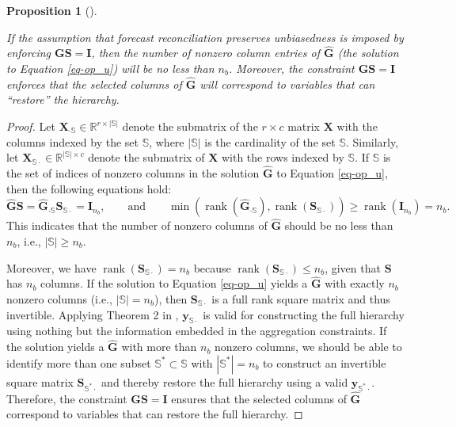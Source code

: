 \documentclass[
  11pt]{article}
\theoremstyle{plain}
\newtheorem{proposition}{Proposition}[section]
\theoremstyle{remark}
\begin{document}
\begin{proposition}[]\protect\hypertarget{prp-1}{}\label{prp-1}

If the assumption that forecast reconciliation preserves unbiasedness is
imposed by enforcing \(\bm{GS}=\bm{I}\), then the number of nonzero
column entries of \(\hat{\bm{G}}\) (the solution to Equation
\eqref{eq-op_u}) will be no less than \(n_b\). Moreover, the constraint
\(\bm{GS}=\bm{I}\) enforces that the selected columns of
\(\hat{\bm{G}}\) will correspond to variables that can ``restore'' the
hierarchy.

\end{proposition}

\begin{proof}
Let \(\bm{X}_{\cdot \mathbb{S}} \in \mathbb{R}^{r \times |\mathbb{S}|}\)
denote the submatrix of the \(r \times c\) matrix \(\bm{X}\) with the
columns indexed by the set \(\mathbb{S}\), where \(|\mathbb{S}|\) is the
cardinality of the set \(\mathbb{S}\). Similarly, let
\(\bm{X}_{\mathbb{S}\cdot} \in \mathbb{R}^{|\mathbb{S}| \times c}\)
denote the submatrix of \(\bm{X}\) with the rows indexed by
\(\mathbb{S}\). If \(\mathbb{S}\) is the set of indices of nonzero
columns in the solution \(\hat{\bm{G}}\) to Equation \eqref{eq-op_u},
then the following equations hold: \[
\hat{\bm{G}}\bm{S} = \hat{\bm{G}}_{\cdot \mathbb{S}}\bm{S}_{\mathbb{S}\cdot} = \bm{I}_{n_b},
\qquad\text{and}\qquad
\min \left(\operatorname{rank}(\hat{\bm{G}}_{\cdot \mathbb{S}}), \operatorname{rank}(\bm{S}_{\mathbb{S}\cdot})\right) \geq \operatorname{rank}(\bm{I}_{n_b})=n_b.
\] This indicates that the number of nonzero columns of \(\hat{\bm{G}}\)
should be no less than \(n_b\), i.e., \(|\mathbb{S}| \geq n_b\).

Moreover, we have
\(\operatorname{rank}(\bm{S}_{\mathbb{S}\cdot}) = n_b\) because
\(\operatorname{rank}(\bm{S}_{\mathbb{S}\cdot}) \leq n_b\), given that
\(\bm{S}\) has \(n_b\) columns. If the solution to Equation
\eqref{eq-op_u} yields a \(\hat{\bm{G}}\) with exactly \(n_b\) nonzero
columns (i.e., \(|\mathbb{S}|=n_b\)), then \(\bm{S}_{\mathbb{S}\cdot}\)
is a full rank square matrix and thus invertible. Applying Theorem 2 in
\citet{Zhang2023-op}, \(\bm{y}_{\mathbb{S}\cdot}\) is valid for
constructing the full hierarchy using nothing but the information
embedded in the aggregation constraints. If the solution yields a
\(\hat{\bm{G}}\) with more than \(n_b\) nonzero columns, we should be
able to identify more than one subset
\(\mathbb{S}^* \subset \mathbb{S}\) with \(|\mathbb{S}^*|=n_b\) to
construct an invertible square matrix \(\bm{S}_{\mathbb{S}^{*}\cdot}\)
and thereby restore the full hierarchy using a valid
\(\bm{y}_{\mathbb{S}^{*}\cdot}\). Therefore, the constraint
\(\bm{GS}=\bm{I}\) ensures that the selected columns of \(\hat{\bm{G}}\)
correspond to variables that can restore the full hierarchy.
\end{proof}
\end{document}
